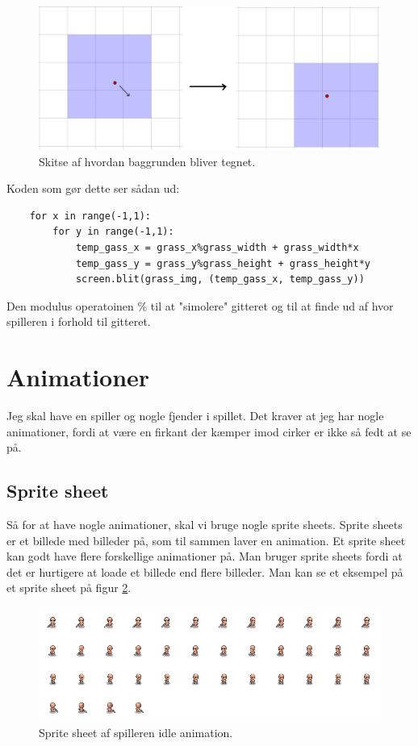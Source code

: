 \documentclass{article}
\begin{document}
    \begin{figure}[h]
    \centering
    \includegraphics[width=0.75\linewidth]{gitter.png}
    \caption{\label{fig:gitter}Skitse af hvordan baggrunden bliver tegnet.}
    \end{figure}
    
    Koden som gør dette ser sådan ud:

    \begin{verbatim}
    for x in range(-1,1):
        for y in range(-1,1):
            temp_gass_x = grass_x%grass_width + grass_width*x
            temp_gass_y = grass_y%grass_height + grass_height*y
            screen.blit(grass_img, (temp_gass_x, temp_gass_y))
    \end{verbatim}

    Den modulus operatoinen \% til at "simolere" gitteret og til at finde ud af hvor spilleren i forhold til gitteret. 
    
\section{Animationer}
Jeg skal have en spiller og nogle fjender i spillet. Det kraver at jeg har nogle animationer, 
fordi at være en firkant der kæmper imod cirker er ikke så fedt at se på. 

    \subsection{Sprite sheet}
    Så for at have nogle animationer, skal vi bruge nogle sprite sheets. 
    Sprite sheets er et billede med billeder på, som til sammen laver en animation.
    Et sprite sheet kan godt have flere forskellige animationer på. 
    Man bruger sprite sheets fordi at det er hurtigere at loade et billede end flere billeder.
    Man kan se et eksempel på et sprite sheet på figur \ref{fig:sprite_sheet}.

    \begin{figure}[h]
    \centering
    \includegraphics[width=0.75\linewidth]{assets/sprites/Player_Idle.png}
    \caption{\label{fig:sprite_sheet}Sprite sheet af spilleren idle animation.}
    \end{figure}
\end{document}
